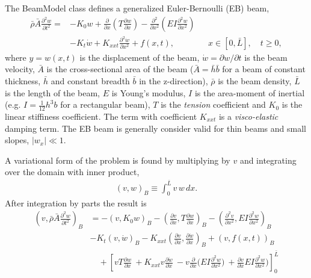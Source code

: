 \documentclass[11pt]{article}
\newcommand{\rhos}{\bar{\rho}}
\newcommand{\hs}{\bar{h}}
\newcommand{\bs}{\bar{b}}
\newcommand{\As}{\bar{A}}
\newcommand{\Ls}{\bar{L}}
\newcommand{\wt}{\dot{w}}
\begin{document}
The BeamModel class defines a generalized Euler-Bernoulli (EB) beam,
\begin{align}
  \rhos \As \frac{\partial^2 w}{\partial t^2} = 
                    & -K_0 w +
                   \frac{\partial}{\partial x}\left( T \frac{\partial w}{\partial x}\right)
                   - \frac{\partial^2}{\partial x^2}\left( E I \frac{\partial^2 w}{\partial x^2}\right) \\
              &    - K_{t} \wt
                   + K_{xxt} \frac{\partial^2 \wt}{\partial x^2}
                   + f(x,t), 
                  \qquad\qquad x\in[0,\Ls], \quad t\ge 0,  \label{eq:BeamModel}
\end{align}
where $y=w(x,t)$ is the displacement of the beam, $\wt=\partial w/\partial t$ is the beam velocity,  
$\As$ is the cross-sectional area of the beam ($\As=\hs\bs$ for a beam of constant thickness, $\hs$ and constant breadth $\bs$ in the z-direction), 
$\rhos$ is the beam density, $\Ls$ is the length of the beam, 
$E$ is Young's modulus, $I$ is the area-moment of inertial (e.g. $I=\frac{1}{12} h^3 b$ for a rectangular beam),
 $T$ is the {\em tension} coefficient and $K_0$ is the linear stiffiness coefficient.
The term with coefficient $K_{xxt}$ is a {\em visco-elastic} damping term. 
% 
The EB beam is generally consider valid for thin beams and small slopes,  $|w_x| \ll 1$.


A variational form of the problem is found by multiplying by $v$ and integrating over the domain with inner product,
\begin{align}
   (v,w)_B \equiv \int_0^{\Ls} v \, w \, dx. 
\end{align}
After integration by parts the result is 
\begin{align}
 \left( v,  \rhos \As \frac{\partial^2 w}{\partial t^2} \right)_B  &= 
                  - \left( v , K_0 w \right)_B
                  - \left( \frac{\partial v}{\partial x} , T \frac{\partial w}{\partial x} \right)_B
                  -\left(\frac{\partial^2 v}{\partial x^2}, E I \frac{\partial^2 w}{\partial x^2}\right)_B  \\
            & - K_{t} \left( v ,\wt \right)_B
              - K_{xxt} \left( \frac{\partial v}{\partial x} ,\frac{\partial \wt}{\partial x} \right)_B
             + ( v, f(x,t))_B \\
             &\quad  +   \left[ v T \frac{\partial w}{\partial x} 
                      ~ + K_{xxt}v  \frac{\partial \wt}{\partial x}
                      ~ -v \frac{\partial}{\partial x}\Big( E I \frac{\partial^2 w}{\partial x^2}\Big) 
                      ~ + \frac{\partial v}{\partial x}E I \frac{\partial^2 w}{\partial x^2}\Big)  
                      \right]_0^{\Ls}   \label{eq:beamBoundaryTerms}
\end{align}
\end{document}
